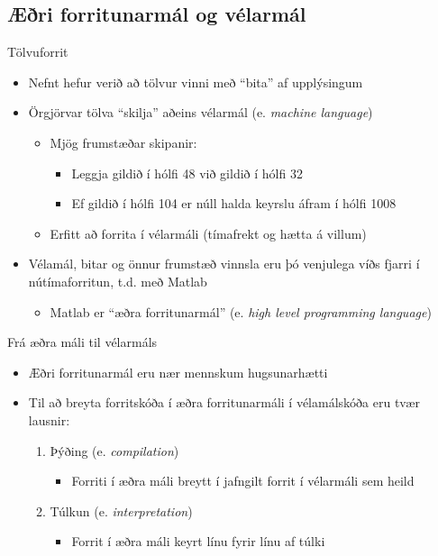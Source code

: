 \documentclass[handout]{beamer}
\begin{document}
\subsection{Æðri forritunarmál og vélarmál}
\begin{frame}{Tölvuforrit}
 \begin{itemize}
  \item Nefnt hefur verið að tölvur vinni með ``bita'' af upplýsingum
  \item Örgjörvar tölva ``skilja'' aðeins vélarmál (e. \emph{machine language})
  \begin{itemize}
   \item Mjög frumstæðar skipanir:
   \begin{itemize}
    \item Leggja gildið í hólfi 48 við gildið í hólfi 32
    \item Ef gildið í hólfi 104 er núll halda keyrslu áfram í hólfi 1008
   \end{itemize}
   \item Erfitt að forrita í vélarmáli (tímafrekt og hætta á villum)
  \end{itemize}
    \item Vélamál, bitar og önnur frumstæð vinnsla eru þó venjulega víðs fjarri í nútímaforritun, t.d. með Matlab
  \begin{itemize}
   \item Matlab er ``æðra forritunarmál'' (e. \emph{high level programming language})
  \end{itemize}
 \end{itemize}
\end{frame}

\begin{frame}{Frá æðra máli til vélarmáls}
\begin{itemize}
 \item Æðri forritunarmál eru nær mennskum hugsunarhætti
 \item Til að breyta forritskóða í æðra forritunarmáli í vélamálskóða eru tvær lausnir:
 \begin{enumerate}
  \item Þýðing (e. \emph{compilation})
  \begin{itemize}
   \item Forriti í æðra máli breytt í jafngilt forrit í vélarmáli sem heild
  \end{itemize}
  \item Túlkun (e. \emph{interpretation})
  \begin{itemize}
   \item Forrit í æðra máli keyrt línu fyrir línu af túlki
  \end{itemize}
 \end{enumerate}
\end{itemize}
\end{frame}
\end{document}
